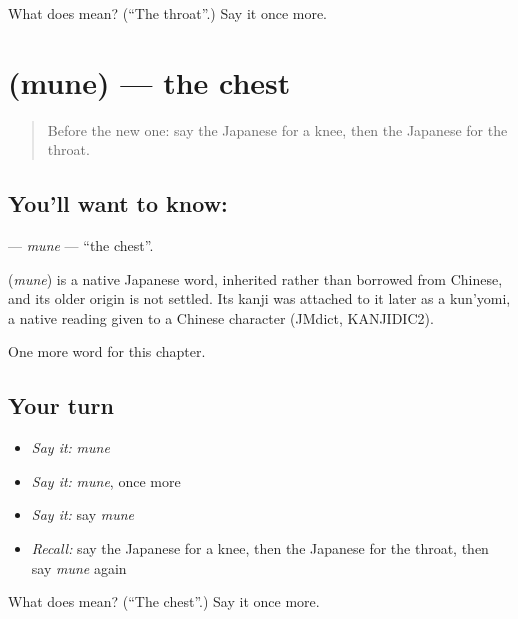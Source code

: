 \begin{tcolorbox}[breakable,colback=teal!4,colframe=teal!35!black,title={Before you move on}]
What does  mean? (\textquotedblleft{}The throat\textquotedblright{}.) Say it once more.
\end{tcolorbox}
\section[\texorpdfstring{\ja{むね} (mune)}{むね (mune)}]{ (mune) — the chest}

\label{lesson:JA-C20-mune}



\begin{quote}
Before the new one: say the Japanese for a knee, then the Japanese for the throat.
\end{quote}

\subsection*{You'll want to know: }
\textbf{} — \emph{mune} — \textquotedblleft{}the chest\textquotedblright{}.

\begin{cousinweb}
\textbf{} (\emph{mune}) is a native Japanese word, inherited rather than borrowed from Chinese, and its older origin is not settled. Its kanji was attached to it later as a kun'yomi, a native reading given to a Chinese character (JMdict, KANJIDIC2).
\end{cousinweb}

\begin{grammarlens}[title={What you've built}]
One more word for this chapter.
\end{grammarlens}

\subsection*{Your turn}
\begin{itemize}
\raggedright
  \item \emph{Say it:} \emph{mune}
  \item \emph{Say it:} \emph{mune}, once more
  \item \emph{Say it:} say \emph{mune}
  \item \emph{Recall:} say the Japanese for a knee, then the Japanese for the throat, then say \emph{mune} again
\end{itemize}

\begin{tcolorbox}[breakable,colback=teal!4,colframe=teal!35!black,title={Before you move on}]
What does  mean? (\textquotedblleft{}The chest\textquotedblright{}.) Say it once more.
\end{tcolorbox}
